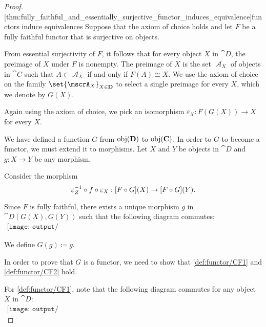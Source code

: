 \begin{proof}
  [thm:fully_faithful_and_essentially_surjective_functor_induces_equivalence]{functors induce equivalences} Suppose that the axiom of choice holds and let \( F \) be a fully faithful functor that is surjective on objects.

  From essential surjectivity of \( F \), it follows that for every object \( X \) in \( \cat{D} \), the preimage of \( X \) under \( F \) is nonempty. The preimage of \( X \) is the set \( \mscrA_X \) of objects in \( \cat{C} \) such that \( A \in \mscrA_X \) if and only if \( F(A) \cong X \). We use the axiom of choice on the family \( \set{ \mscrA_X }_{X \in \cat{D}} \) to select a single preimage for every \( X \), which we denote by \( G(X) \).

  Again using the axiom of choice, we pick an isomorphism \( \varepsilon_X: F(G(X)) \to X \) for every \( X \).

  We have defined a function \( G \) from \( \operatorname{obj}(\operatorname{\mathbf{D}}) \) to \( \operatorname{obj}(\operatorname{\mathbf{C}}) \). In order to \( G \) to become a functor, we must extend it to morphisms. Let \( X \) and \( Y \) be objects in \( \cat{D} \) and \( g: X \to Y \) be any morphism.

  Consider the morphism
  \begin{equation*}
    \varepsilon_Z^{-1} \bincirc f \bincirc \varepsilon_X: [F \bincirc G](X) \to [F \bincirc G](Y).
  \end{equation*}

  Since \( F \) is fully faithful, there exists a unique morphism \( g \) in \( \cat{D}(G(X), G(Y)) \) such that the following diagram commutes:
  \begin{equation}\label{eq:thm:fully_faithful_and_essentially_surjective_functor_induces_equivalence/inverse_morphism_definition}
    \begin{aligned}
      \texttt{[image: output/thm\_\_fully\_faithful\_and\_essentially\_surjective\_functor\_induces\_equivalence.pdf]}
    \end{aligned}
  \end{equation}

  We define \( G(g) \coloneqq g \).

  In order to prove that \( G \) is a functor, we need to show that \ref{def:functor/CF1} and \ref{def:functor/CF2} hold.

  For \ref{def:functor/CF1}, note that the following diagram commutes for any object \( X \) in \( \cat{D} \):
  \begin{equation}\label{eq:thm:fully_faithful_and_essentially_surjective_functor_induces_equivalence/identity}
    \begin{aligned}
      \texttt{[image: output/thm\_\_fully\_faithful\_and\_essentially\_surjective\_functor\_induces\_equivalence.pdf]}
    \end{aligned}
  \end{equation}


\end{proof}
